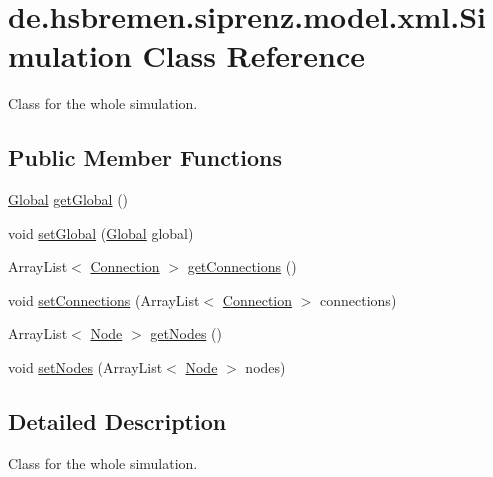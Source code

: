 \hypertarget{classde_1_1hsbremen_1_1siprenz_1_1model_1_1xml_1_1Simulation}{}\section{de.\+hsbremen.\+siprenz.\+model.\+xml.\+Simulation Class Reference}
\label{classde_1_1hsbremen_1_1siprenz_1_1model_1_1xml_1_1Simulation}


Class for the whole simulation.  


\subsection*{Public Member Functions}
\begin{DoxyCompactItemize}
\item 
\hyperlink{classde_1_1hsbremen_1_1siprenz_1_1model_1_1xml_1_1Global}{Global} \hyperlink{classde_1_1hsbremen_1_1siprenz_1_1model_1_1xml_1_1Simulation_a5de2d2c7931dd9e63c3750308ad7e68a}{get\+Global} ()
\item 
void \hyperlink{classde_1_1hsbremen_1_1siprenz_1_1model_1_1xml_1_1Simulation_a6b9f032eebc383e28bc17c85efb82867}{set\+Global} (\hyperlink{classde_1_1hsbremen_1_1siprenz_1_1model_1_1xml_1_1Global}{Global} global)
\item 
Array\+List$<$ \hyperlink{classde_1_1hsbremen_1_1siprenz_1_1model_1_1xml_1_1Connection}{Connection} $>$ \hyperlink{classde_1_1hsbremen_1_1siprenz_1_1model_1_1xml_1_1Simulation_a3d8f5ba52821c49ec09d7330b28d746c}{get\+Connections} ()
\item 
void \hyperlink{classde_1_1hsbremen_1_1siprenz_1_1model_1_1xml_1_1Simulation_aad199aa4a6175a6c89861437969a8020}{set\+Connections} (Array\+List$<$ \hyperlink{classde_1_1hsbremen_1_1siprenz_1_1model_1_1xml_1_1Connection}{Connection} $>$ connections)
\item 
Array\+List$<$ \hyperlink{classde_1_1hsbremen_1_1siprenz_1_1model_1_1xml_1_1Node}{Node} $>$ \hyperlink{classde_1_1hsbremen_1_1siprenz_1_1model_1_1xml_1_1Simulation_a2a45fc72e1d1c2591dee145090b0f579}{get\+Nodes} ()
\item 
void \hyperlink{classde_1_1hsbremen_1_1siprenz_1_1model_1_1xml_1_1Simulation_add0ed0bfe51af13b276a2aa6e708e7a6}{set\+Nodes} (Array\+List$<$ \hyperlink{classde_1_1hsbremen_1_1siprenz_1_1model_1_1xml_1_1Node}{Node} $>$ nodes)
\end{DoxyCompactItemize}


\subsection{Detailed Description}
Class for the whole simulation. 

